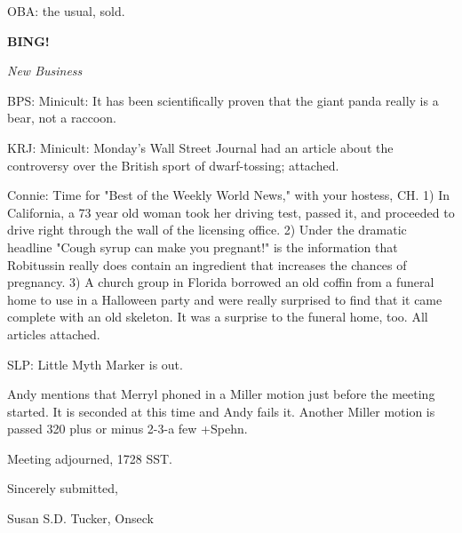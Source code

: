 \documentclass[12pt]{article}
\newcommand{\bing}{{\bf BING!} }
\newcommand{\goto}[1]{\bing \vskip 12pt \centerline{{\em{#1}}}}
\begin{document}
OBA: the usual, sold.

\goto{New Business}

BPS: Minicult: It has been scientifically proven that the giant panda really is a bear, not a raccoon.

KRJ: Minicult: Monday's Wall Street Journal had an article about the controversy over the British sport of dwarf-tossing; attached.

Connie: Time for "Best of the Weekly World News," with your hostess, CH. 1) In California, a 73 year old woman took her driving test, passed it, and proceeded to drive right through the wall of the licensing office. 2) Under the dramatic headline "Cough syrup can make you pregnant!" is the information that Robitussin really does contain an ingredient that increases the chances of pregnancy. 3) A church group in Florida borrowed an old coffin from a funeral home to use in a  Halloween party and were really surprised to find that it came complete with an old skeleton. It was a surprise to the funeral home, too. All articles attached.

SLP: Little Myth Marker is out.

Andy mentions that Merryl phoned in a Miller motion just before the meeting started. It is seconded at this time and Andy fails it. Another Miller motion is passed 320 plus or minus 2-3-a few +Spehn.

\vspace{12pt}

\noindent
Meeting adjourned, 1728 SST.

\vspace{18pt}

\centerline{Sincerely submitted,}
\centerline{Susan S.D. Tucker, Onseck}
\end{document}
